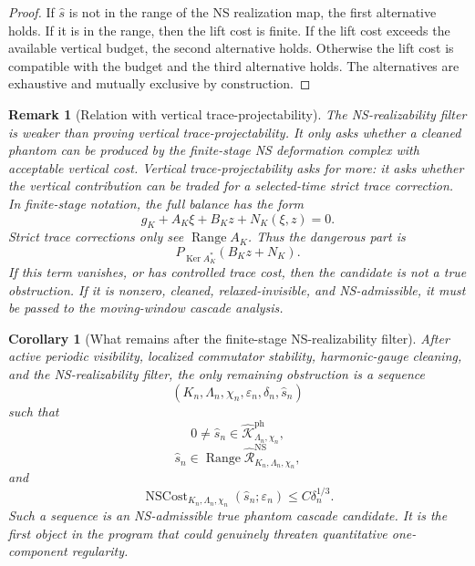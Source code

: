 \documentclass[11pt]{article}
\numberwithin{equation}{section}
\newtheorem{corollary}[theorem]{Corollary}
\newtheorem{remark}[theorem]{Remark}
\DeclareMathOperator{\Range}{Range}
\DeclareMathOperator{\Ker}{Ker}
\begin{document}
\begin{proof}
If \(\widehat s\) is not in the range of the NS realization map, the first alternative holds.  If it is in the range, then the lift cost is finite.  If the lift cost exceeds the available vertical budget, the second alternative holds.  Otherwise the lift cost is compatible with the budget and the third alternative holds.  The alternatives are exhaustive and mutually exclusive by construction.
\end{proof}

\begin{remark}[Relation with vertical trace-projectability]\label{rem:NS-filter-trace-projectability}
The NS-realizability filter is weaker than proving vertical trace-projectability.  It only asks whether a cleaned phantom can be produced by the finite-stage NS deformation complex with acceptable vertical cost.  Vertical trace-projectability asks for more: it asks whether the vertical contribution can be traded for a selected-time strict trace correction.  In finite-stage notation, the full balance has the form
\[
        g_K+A_K\xi+B_Kz+N_K(\xi,z)=0.
\]
Strict trace corrections only see \(\Range A_K\).  Thus the dangerous part is
\[
        P_{\Ker A_K^*}(B_Kz+N_K).
\]
If this term vanishes, or has controlled trace cost, then the candidate is not a true obstruction.  If it is nonzero, cleaned, relaxed-invisible, and NS-admissible, it must be passed to the moving-window cascade analysis.
\end{remark}

\begin{corollary}[What remains after the finite-stage NS-realizability filter]\label{cor:what-remains-after-step5}
After active periodic visibility, localized commutator stability, harmonic-gauge cleaning, and the NS-realizability filter, the only remaining obstruction is a sequence
\[
        (K_n,\Lambda_n,\chi_n,\varepsilon_n,\delta_n,\widehat s_n)
\]
such that
\[
        0\neq\widehat s_n
        \in
        \widehat{\mathcal K}_{\Lambda_n,\chi_n}^{\mathrm{ph}},
\]
\[
        \widehat s_n
        \in
        \Range \widehat{\mathcal R}_{K_n,\Lambda_n,\chi_n}^{\mathrm{NS}},
\]
and
\[
        \operatorname{NSCost}_{K_n,\Lambda_n,\chi_n}(\widehat s_n;\varepsilon_n)
        \le
        C\delta_n^{1/3}.
\]
Such a sequence is an NS-admissible true phantom cascade candidate.  It is the first object in the program that could genuinely threaten quantitative one-component regularity.
\end{corollary}
\end{document}
